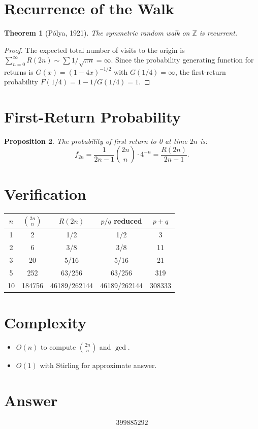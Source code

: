 \documentclass[11pt]{article}
\newtheorem{theorem}{Theorem}
\newtheorem{proposition}[theorem]{Proposition}
\begin{document}
\section{Recurrence of the Walk}

\begin{theorem}[P\'olya, 1921]
The symmetric random walk on $\mathbb{Z}$ is recurrent.
\end{theorem}

\begin{proof}
The expected total number of visits to the origin is $\sum_{n=0}^{\infty} R(2n) \sim \sum 1/\sqrt{\pi n} = \infty$. Since the probability generating function for returns is $G(x) = (1-4x)^{-1/2}$ with $G(1/4) = \infty$, the first-return probability $F(1/4) = 1 - 1/G(1/4) = 1$.
\end{proof}

\section{First-Return Probability}

\begin{proposition}
The probability of first return to 0 at time $2n$ is:
\[
f_{2n} = \frac{1}{2n-1}\binom{2n}{n}\cdot 4^{-n} = \frac{R(2n)}{2n-1}.
\]
\end{proposition}

\section{Verification}

\begin{center}
\begin{tabular}{ccccc}
\toprule
$n$ & $\binom{2n}{n}$ & $R(2n)$ & $p/q$ reduced & $p+q$ \\
\midrule
1  & 2      & 1/2     & 1/2       & 3 \\
2  & 6      & 3/8     & 3/8       & 11 \\
3  & 20     & 5/16    & 5/16      & 21 \\
5  & 252    & 63/256  & 63/256    & 319 \\
10 & 184756 & 46189/262144 & 46189/262144 & 308333 \\
\bottomrule
\end{tabular}
\end{center}

\section{Complexity}

\begin{itemize}
\item $O(n)$ to compute $\binom{2n}{n}$ and $\gcd$.
\item $O(1)$ with Stirling for approximate answer.
\end{itemize}

\section{Answer}

\[
\boxed{399885292}
\]
\end{document}
